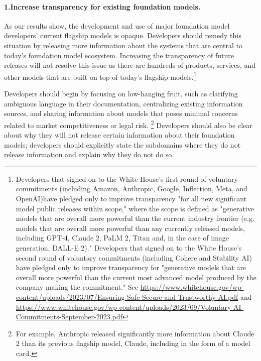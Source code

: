 \documentclass[screen, authorversion, acmsmall]{acmart}
\begin{document}
\paragraph{1.\phantom{X}Increase transparency for existing foundation models.} 
\begin{myitemize}
\item As our results show, the development and use of major foundation model developers' current flagship models is opaque. 
Developers should remedy this situation by releasing more information about the systems that are central to today's foundation model ecosystem. 
Increasing the transparency of future releases will not resolve this issue as there are hundreds of products, services, and other models that are built on top of today's flagship models.\footnote{Developers that signed on to the White House's first round of voluntary commitments (including Amazon, Anthropic, Google, Inflection, Meta, and OpenAI)have pledged only to improve transparency "for all new significant model public releases within scope," where the scope is defined as "generative models that are overall more powerful than the current industry frontier (e.g. models that are overall more powerful than any currently released models, including GPT-4, Claude 2, PaLM 2, Titan and, in the case of image generation, DALL-E 2)." Developers that signed on to the White House's second round of voluntary commitments (including Cohere and Stability AI) have pledged only to improve transparency for "generative models that are overall more powerful than the current most advanced model produced by the company making the commitment." See \url{https://www.whitehouse.gov/wp-content/uploads/2023/07/Ensuring-Safe-Secure-and-Trustworthy-AI.pdf} and \url{https://www.whitehouse.gov/wp-content/uploads/2023/09/Voluntary-AI-Commitments-September-2023.pdf}}
\item Developers should begin by focusing on low-hanging fruit, such as clarifying ambiguous language in their documentation, centralizing existing information sources, and sharing information about models that poses minimal concerns related to market competitiveness or legal risk.
\footnote{For example, Anthropic released significantly more information about Claude 2 than its previous flagship model, Claude, including in the form of a model card.} 
Developers should also be clear about why they will not release certain information about their foundation models; developers should explicitly state the subdomains where they do not release information and explain why they do not do so. 
\end{myitemize}
\end{document}

